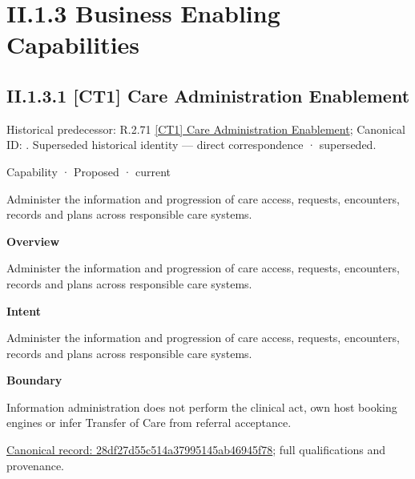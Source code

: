 \section*{II.1.3 Business Enabling Capabilities}
\label{navigation:II.1.3}

\subsection*{II.1.3.1 [CT1] Care Administration Enablement}
\label{navigation:II.1.3.1}

{\small Historical predecessor: R.2.71 \hyperref[element:b611a1fcfadb4b30af9ba74a4c993d8a]{[CT1] Care Administration Enablement}; Canonical ID: \texttt{}. Superseded historical identity — direct correspondence · superseded.}\par
\label{element:28df27d55c514a37995145ab46945f78}
{\small Capability · Proposed · current}\par

Administer the information and progression of care access, requests, encounters, records and plans across responsible care systems.



\textbf{Overview}



Administer the information and progression of care access, requests, encounters, records and plans across responsible care systems.



\textbf{Intent}



Administer the information and progression of care access, requests, encounters, records and plans across responsible care systems.



\textbf{Boundary}



Information administration does not perform the clinical act, own host booking engines or infer Transfer of Care from referral acceptance.


{\footnotesize \href{../../../../continuum/strategy/capability/28df27d55c514a37995145ab46945f78.md}{Canonical record: 28df27d55c514a37995145ab46945f78}; full qualifications and provenance.}\par
